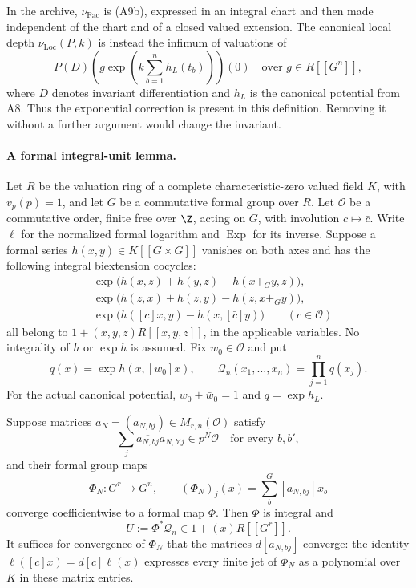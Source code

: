 \documentclass[11pt]{article}
\theoremstyle{definition}\newtheorem{definition}[theorem]{Definition}\newtheorem{remark}[theorem]{Remark}
\begin{document}
In the archive, $\nu_{\mathrm{Fac}}$ is (A9b), expressed in an
integral chart and then made independent of the chart and of a
closed valued extension.  The canonical local depth
$\nu_{\mathrm{Loc}}(P,k)$ is instead the infimum of valuations
of
\[
 P(D)\left(g\exp\!\left(k\sum_{b=1}^n h_L(t_b)\right)\right)(0)
 \quad\text{over }g\in R[[G^n]],
 \tag{A9c}
\]
where $D$ denotes invariant differentiation and $h_L$ is the
canonical potential from A8.  Thus the exponential correction
is present in this definition.  Removing it without a further
argument would change the invariant.

\paragraph{A formal integral-unit lemma.}
Let $R$ be the valuation ring of a complete characteristic-zero
valued field $K$, with $v_p(p)=1$, and let $G$ be a commutative
formal group over $R$.  Let $\mathcal O$ be a commutative order, finite free
over $\Z$, acting on $G$, with involution $c\mapsto\bar c$.
Write $\ell$ for the normalized formal logarithm and
$\operatorname{Exp}$ for its inverse.  Suppose a formal series
$h(x,y)\in K[[G\times G]]$ vanishes on both axes and has the
following integral biextension cocycles:
\[
\begin{split}
 &\exp\bigl(h(x,z)+h(y,z)-h(x+_G y,z)\bigr),\\
 &\exp\bigl(h(z,x)+h(z,y)-h(z,x+_G y)\bigr),\\
 &\exp\bigl(h([c]x,y)-h(x,[\bar c]y)\bigr)
       \qquad(c\in\mathcal O)
\end{split}
 \tag{A9d}
\]
all belong to $1+(x,y,z)R[[x,y,z]]$, in the applicable variables.
No integrality of $h$ or $\exp h$ is assumed.
Fix $w_0\in\mathcal O$ and put
\[
 q(x)=\exp h(x,[w_0]x),\qquad
 \mathcal Q_n(x_1,\ldots,x_n)=\prod_{j=1}^n q(x_j).
 \tag{A9e}
\]
For the actual canonical potential, $w_0+\bar w_0=1$ and
$q=\exp h_L$.

Suppose matrices $a_N=(a_{N,bj})\in M_{r,n}(\mathcal O)$
satisfy
\[
 \sum_j\overline{a_{N,bj}}a_{N,b'j}\in p^N\mathcal O
       \quad\text{for every }b,b',
 \tag{A9f}
\]
and their formal group maps
\[
 \Phi_N:G^r\longrightarrow G^n,\qquad
 (\Phi_N)_j(x)=\sum_b^G[a_{N,bj}]x_b
\]
converge coefficientwise to a formal map $\Phi$.
Then $\Phi$ is integral and
\[
                 U:=\Phi^*\mathcal Q_n
                     \in 1+(x)R[[G^r]] .
 \tag{A9g}
\]
It suffices for convergence of $\Phi_N$ that the matrices
$d[a_{N,bj}]$ converge: the identity
$\ell([c]x)=d[c]\ell(x)$ expresses every finite jet of
$\Phi_N$ as a polynomial over $K$ in these matrix entries.
\end{document}
